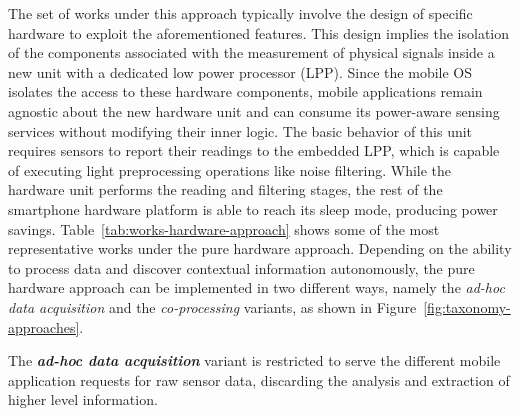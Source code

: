 \documentclass[ENG,PhD]{cinvestav}
\begin{document}
The set of works under this approach typically involve the design of specific hardware to exploit the aforementioned features.
This design implies the isolation of the components associated with the measurement of physical signals inside a new unit with a dedicated low power processor (LPP).
Since the mobile OS isolates the access to these hardware components, mobile applications remain agnostic about the new hardware unit and can consume its power-aware sensing services without modifying their inner logic.
The basic behavior of this unit requires sensors to report their readings to the embedded LPP, which is capable of executing light preprocessing operations like noise filtering.
While the hardware unit performs the reading and filtering stages, the rest of the smartphone hardware platform is able to reach its sleep mode, producing power savings.
Table~\ref{tab:works-hardware-approach} shows some of the most representative works under the pure hardware approach.
Depending on the ability to process data and discover contextual information autonomously, the pure hardware approach can be implemented in two different ways, namely the \emph{ad-hoc data acquisition} and the \emph{co-processing} variants, as shown in Figure~\ref{fig:taxonomy-approaches}.



The \emph{\textbf{ad-hoc data acquisition}} variant is restricted to serve the different mobile application requests for raw sensor data, discarding the analysis and extraction of higher level information.
\end{document}
